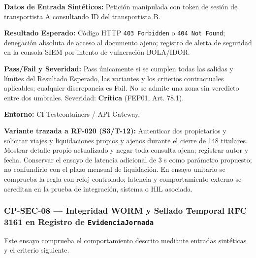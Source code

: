 \par\noindent\textbf{Datos de Entrada Sintéticos:} Petición manipulada con token de sesión de transportista A consultando ID del transportista B.\par
\par\noindent\textbf{Resultado Esperado:} Código HTTP \texttt{4\allowbreak{}0\allowbreak{}3\allowbreak{} F\allowbreak{}o\allowbreak{}r\allowbreak{}b\allowbreak{}i\allowbreak{}d\allowbreak{}d\allowbreak{}e\allowbreak{}n\allowbreak{}} o \texttt{4\allowbreak{}0\allowbreak{}4\allowbreak{} N\allowbreak{}o\allowbreak{}t\allowbreak{} F\allowbreak{}o\allowbreak{}u\allowbreak{}n\allowbreak{}d\allowbreak{}}; denegación absoluta de acceso al documento ajeno; registro de alerta de seguridad en la consola SIEM por intento de vulneración BOLA/IDOR.\par
\par\noindent\textbf{Pass/Fail y Severidad:} Pass únicamente si se cumplen todas las salidas y límites del Resultado Esperado, las variantes y los criterios contractuales aplicables; cualquier discrepancia es Fail. No se admite una zona sin veredicto entre dos umbrales. Severidad: \textbf{Crítica} (FEP01, Art. 78.1).\par
\par\noindent\textbf{Entorno:} CI Testcontainers / API Gateway.\par







\par\noindent\textbf{Variante trazada a RF-020 (S3/T-12):} Autenticar dos propietarios y solicitar viajes y liquidaciones propios y ajenos durante el cierre de 148 titulares. Mostrar detalle propio actualizado y negar toda consulta ajena; registrar autor y fecha. Conservar el ensayo de latencia adicional de 3 s como parámetro propuesto; no confundirlo con el plazo mensual de liquidación. En ensayo unitario se comprueba la regla con reloj controlado; latencia y comportamiento externo se acreditan en la prueba de integración, sistema o HIL asociada.\par
\subsubsection*{CP-SEC-08 — Integridad WORM y Sellado Temporal RFC 3161 en Registro de \texttt{E\allowbreak{}v\allowbreak{}i\allowbreak{}d\allowbreak{}e\allowbreak{}n\allowbreak{}c\allowbreak{}i\allowbreak{}a\allowbreak{}J\allowbreak{}o\allowbreak{}r\allowbreak{}n\allowbreak{}a\allowbreak{}d\allowbreak{}a\allowbreak{}}}\label{sec:9-cp-sec-08}
Este ensayo comprueba el comportamiento descrito mediante entradas sintéticas y el criterio siguiente.

